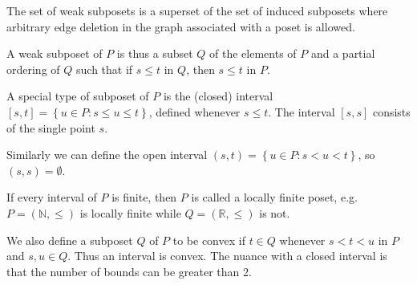 
The set of weak subposets is a superset of the set of induced subposets where arbitrary edge deletion in the graph associated with a poset is allowed.


A weak subposet of $P$ is thus a subset $Q$ of the elements of $P$ and a partial ordering of $Q$ such that if $s \leq t$ in $Q$, then $s \leq t$ in $P$.



A special type of subposet of $P$ is the (closed) interval $[s, t] = \left\{{u \in P : s \leq u \leq t}\right\}$, defined whenever $s \leq t$. The interval $[s, s]$ consists of the single point $s$.


Similarly we can define the open interval $(s, t) = \left\{{u \in P : s < u < t}\right\}$, so $(s, s) = \emptyset$.

If every interval of $P$ is finite, then $P$ is called a locally finite poset, e.g. $P = (\mathbb{N}, \le)$ is locally finite while $Q = (\mathbb{R}, \le)$ is not.


We also define a subposet $Q$ of $P$ to be convex if $t \in Q$ whenever $s < t < u$ in $P$ and $s, u \in Q$. Thus an interval is convex. The nuance with a closed interval is that the number of bounds can be greater than 2.

